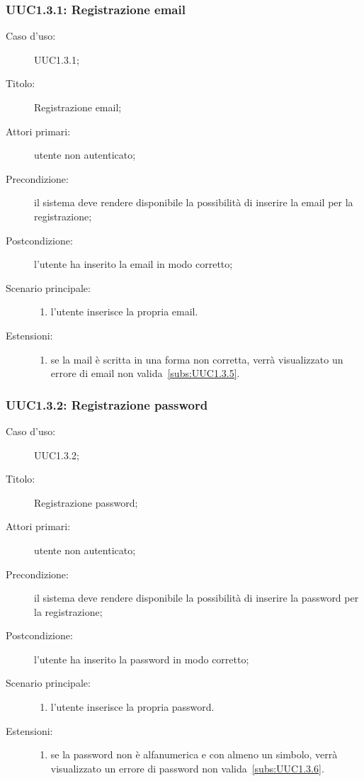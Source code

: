 \documentclass[../../../analisi-dei-requisiti.tex]{subfiles}
\begin{document}
\subsubsection{UUC1.3.1: Registrazione email}%
\label{subs:UUC1.3.1}
\begin{description}
  \item[Caso d'uso:] UUC1.3.1;
  \item[Titolo:] Registrazione email;
  \item[Attori primari:] utente non autenticato;
  \item[Precondizione:] il sistema deve rendere disponibile la possibilità di inserire la email per la registrazione;
  \item[Postcondizione:] l'utente ha inserito la email in modo corretto;
  \item[Scenario principale:]
        \begin{enumerate}
          \item l'utente inserisce la propria email.
        \end{enumerate}
  \item[Estensioni:]
        \begin{enumerate}
          \item se la mail è scritta in una forma non corretta, verrà visualizzato un errore di email non valida~\ref{subs:UUC1.3.5}.
        \end{enumerate}
\end{description}



\subsubsection{UUC1.3.2: Registrazione password}%
\label{subs:UUC1.3.2}
\begin{description}
  \item[Caso d'uso:] UUC1.3.2;
  \item[Titolo:] Registrazione password;
  \item[Attori primari:] utente non autenticato;
  \item[Precondizione:] il sistema deve rendere disponibile la possibilità di inserire la password per la registrazione;
  \item[Postcondizione:] l'utente ha inserito la password in modo corretto;
  \item[Scenario principale:]
        \begin{enumerate}
          \item l'utente inserisce la propria password.
        \end{enumerate}
  \item[Estensioni:]
        \begin{enumerate}
          \item se la password non è alfanumerica e con almeno un simbolo, verrà visualizzato un errore di password non valida~\ref{subs:UUC1.3.6}.
        \end{enumerate}
\end{description}
\end{document}
